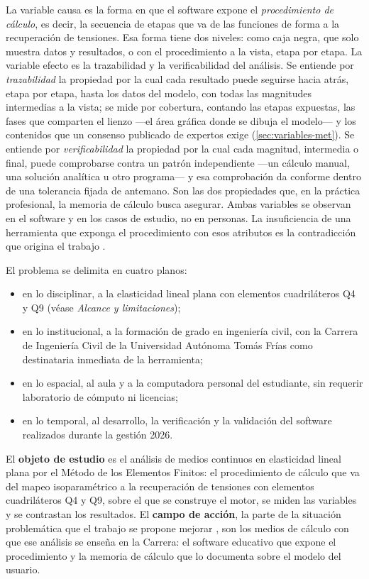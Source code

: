 La variable causa es la forma en que el software expone el \emph{procedimiento de cálculo}, es decir, la secuencia de etapas que va de las funciones de forma a la recuperación de tensiones. Esa forma tiene dos niveles: como caja negra, que solo muestra datos y resultados, o con el procedimiento a la vista, etapa por etapa. La variable efecto es la trazabilidad y la verificabilidad del análisis. Se entiende por \emph{trazabilidad} la propiedad por la cual cada resultado puede seguirse hacia atrás, etapa por etapa, hasta los datos del modelo, con todas las magnitudes intermedias a la vista; se mide por cobertura, contando las etapas expuestas, las fases que comparten el lienzo ---el área gráfica donde se dibuja el modelo--- y los contenidos que un consenso publicado de expertos exige (\autoref{sec:variables-met}). Se entiende por \emph{verificabilidad} la propiedad por la cual cada magnitud, intermedia o final, puede comprobarse contra un patrón independiente —un cálculo manual, una solución analítica u otro programa— y esa comprobación da conforme dentro de una tolerancia fijada de antemano. Son las dos propiedades que, en la práctica profesional, la memoria de cálculo busca asegurar. Ambas variables se observan en el software y en los casos de estudio, no en personas. La insuficiencia de una herramienta que exponga el procedimiento con esos atributos es la contradicción que origina el trabajo \autocite[p.~7]{alvarez_metodologia}.

El problema se delimita en cuatro planos:
\begin{itemize}
    \item en lo disciplinar, a la elasticidad lineal plana con elementos cuadriláteros Q4 y Q9 (véase \emph{Alcance y limitaciones});
    \item en lo institucional, a la formación de grado en ingeniería civil, con la Carrera de Ingeniería Civil de la Universidad Autónoma Tomás Frías como destinataria inmediata de la herramienta;
    \item en lo espacial, al aula y a la computadora personal del estudiante, sin requerir laboratorio de cómputo ni licencias;
    \item en lo temporal, al desarrollo, la verificación y la validación del software realizados durante la gestión 2026.
\end{itemize}

El \textbf{objeto de estudio} \autocite[p.~8]{alvarez_metodologia} es el análisis de medios continuos en elasticidad lineal plana por el Método de los Elementos Finitos: el procedimiento de cálculo que va del mapeo isoparamétrico a la recuperación de tensiones con elementos cuadriláteros Q4 y Q9, sobre el que se construye el motor, se miden las variables y se contrastan los resultados. El \textbf{campo de acción}, la parte de la situación problemática que el trabajo se propone mejorar \autocite[p.~13]{alvarez_metodologia}, son los medios de cálculo con que ese análisis se enseña en la Carrera: el software educativo que expone el procedimiento y la memoria de cálculo que lo documenta sobre el modelo del usuario.

